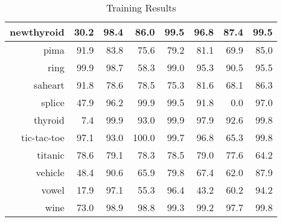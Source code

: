 \documentclass[a4paper,10pt]{article}
\begin{document}
\begin{table}[!htp]
\begin{tabular}{
|r|r|r|r|r|r|r|r|}
\hline
newthyroid & 30.2 & 98.4 & 86.0 & 99.5 & 96.8 & 87.4 & 99.5\\
\hline
pima & 91.9 & 83.8 & 75.6 & 79.2 & 81.1 & 69.9 & 85.0\\
\hline
ring & 99.9 & 98.7 & 58.3 & 99.0 & 95.3 & 90.5 & 95.5\\
\hline
saheart & 91.8 & 78.6 & 78.5 & 75.3 & 81.6 & 68.1 & 86.3\\
\hline
splice & 47.9 & 96.2 & 99.9 & 99.5 & 91.8 & 0.0 & 97.0\\
\hline
thyroid & 7.4 & 99.9 & 93.0 & 99.9 & 97.9 & 92.6 & 99.8\\
\hline
tic-tac-toe & 97.1 & 93.0 & 100.0 & 99.7 & 96.8 & 65.3 & 99.8\\
\hline
titanic & 78.6 & 79.1 & 78.3 & 78.5 & 79.0 & 77.6 & 64.2\\
\hline
vehicle & 48.4 & 90.6 & 65.9 & 79.8 & 67.4 & 62.0 & 87.9\\
\hline
vowel & 17.9 & 97.1 & 55.3 & 96.4 & 43.2 & 60.2 & 94.2\\
\hline
wine & 73.0 & 98.9 & 98.8 & 99.3 & 99.2 & 97.7 & 99.8\\
\hline



\end{tabular}
\caption{Training Results}
\end{table}

\newpage
\end{document}
